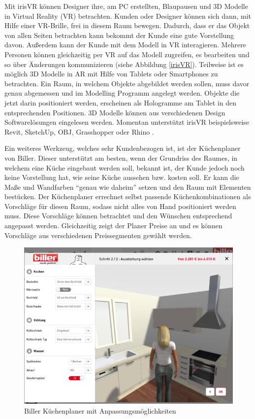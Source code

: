 Mit irisVR können Designer ihre, am PC erstellten, Blaupausen und 3D Modelle in Virtual Reality (VR) betrachten. Kunden oder Designer können sich dann, mit Hilfe einer VR-Brille, frei in diesem Raum bewegen. Dadurch, dass er das Objekt von allen Seiten betrachten kann bekommt der Kunde eine gute Vorstellung davon. Außerdem kann der Kunde mit dem Modell in VR interagieren. Mehrere Personen können gleichzeitig per VR auf das Modell zugreifen, es bearbeiten und so über Änderungen kommunizieren (siehe Abbildung \ref{irisVR}). Teilweise ist es möglich 3D Modelle in AR mit Hilfe von Tablets oder Smartphones zu betrachten. Ein Raum, in welchem Objekte abgebildet werden sollen, muss davor genau abgemessen und im Modelling Programm angelegt werden. Objekte die jetzt darin positioniert werden, erscheinen als Hologramme am Tablet in den entsprechenden Positionen. 3D Modelle können aus verschiedenen Design Softwarelösungen eingelesen werden. Momentan unterstützt irisVR beispielsweise Revit, SketchUp, OBJ, Grasshopper oder Rhino \cite{helander_joel_2017}. 

Ein weiteres Werkzeug, welches sehr Kundenbezogen ist, ist der Küchenplaner von Biller. Dieser unterstützt am besten, wenn der Grundriss des Raumes, in welchem eine Küche eingebaut werden soll, bekannt ist, der Kunde jedoch noch keine Vorstellung hat, wie seine Küche aussehen bzw. kosten soll. Er kann die Maße und Wandfarben \enquote{genau wie daheim} setzen und den Raum mit Elementen bestücken. Der Küchenplaner errechnet selbst passende Küchenkombinationen als Vorschläge für diesen Raum, sodass nicht alles von Hand positioniert werden muss. Diese Vorschläge können betrachtet und den Wünschen entsprechend angepasst werden. Gleichzeitig zeigt der Planer Preise an und es können Vorschläge aus verschiedenen Preissegmenten gewählt werden.

\begin{figure}[H]
	\begin{center}
		\noindent\includegraphics[scale=0.5]{Resources/Hintergrund/biller.png}
		\caption{Biller Küchenplaner mit Anpassungsmöglichkeiten}	
	\end{center}
\end{figure}

